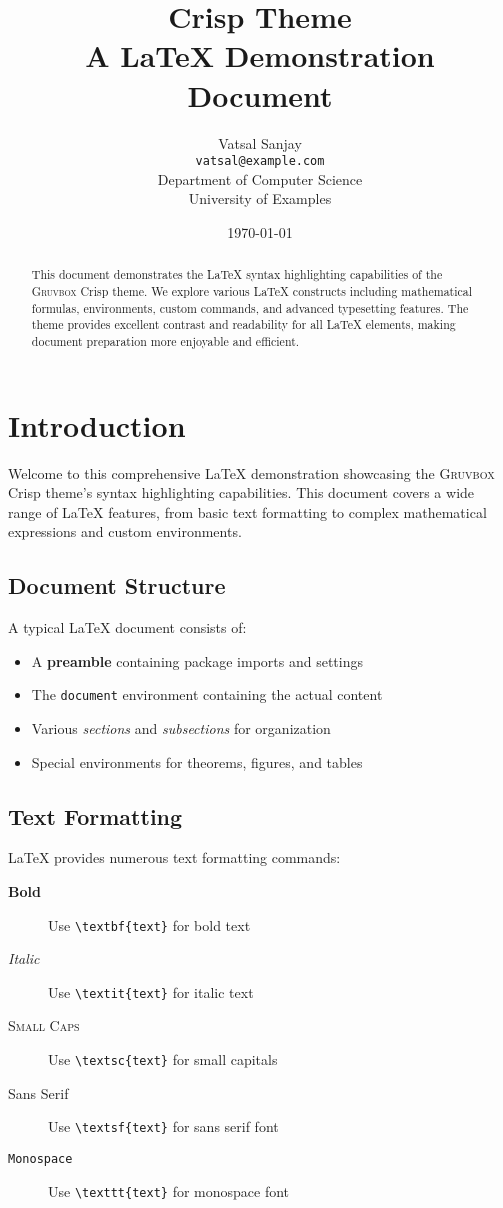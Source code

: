 \documentclass[12pt,a4paper]{article}
\title{{\Huge\gruvbox{} Crisp Theme}\\[0.5em]
       \Large A LaTeX Demonstration Document}
\author{Vatsal Sanjay\\
        \texttt{vatsal@example.com}\\[0.5em]
        Department of Computer Science\\
        University of Examples}
\date{\today}
\newcommand{\gruvbox}{\textsc{Gruvbox}}
\theoremstyle{definition}
\theoremstyle{remark}
\begin{document}
\maketitle

\begin{abstract}
This document demonstrates the \LaTeX{} syntax highlighting capabilities of the \gruvbox{} Crisp theme. We explore various \LaTeX{} constructs including mathematical formulas, environments, custom commands, and advanced typesetting features. The theme provides excellent contrast and readability for all \LaTeX{} elements, making document preparation more enjoyable and efficient.
\end{abstract}

\tableofcontents
\newpage

\section{Introduction}
\label{sec:intro}

Welcome to this comprehensive \LaTeX{} demonstration showcasing the \gruvbox{} Crisp theme's syntax highlighting capabilities. This document covers a wide range of \LaTeX{} features, from basic text formatting to complex mathematical expressions and custom environments.

\subsection{Document Structure}

A typical \LaTeX{} document consists of:
\begin{itemize}
    \item A \textbf{preamble} containing package imports and settings
    \item The \texttt{document} environment containing the actual content
    \item Various \emph{sections} and \emph{subsections} for organization
    \item Special environments for theorems, figures, and tables
\end{itemize}

\subsection{Text Formatting}

\LaTeX{} provides numerous text formatting commands:
\begin{description}
    \item[\textbf{Bold}] Use \verb|\textbf{text}| for bold text
    \item[\textit{Italic}] Use \verb|\textit{text}| for italic text
    \item[\textsc{Small Caps}] Use \verb|\textsc{text}| for small capitals
    \item[\textsf{Sans Serif}] Use \verb|\textsf{text}| for sans serif font
    \item[\texttt{Monospace}] Use \verb|\texttt{text}| for monospace font
\end{description}
\end{document}
